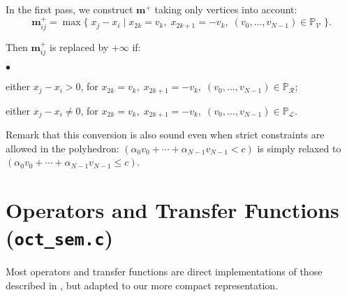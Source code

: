 \documentclass[twosides]{report}
\newenvironment{mylist}
        {\vskip-3mm\begin{list}{$\bullet$}{\setlength{\leftmargin}{.5cm}}}
        {\end{list}}
\renewcommand{\vec}[1]{{{\mathbf #1}}}
\begin{document}
In the first pass, we construct $\vec{m}^+$ taking only 
vertices into account:
$$\vec{m}^+_{ij}=\max
\{\;x_j-x_i\;|\;x_{2k}=v_k,\;x_{2k+1}=-v_k,\;
(v_0,\ldots,v_{N-1})\in\mathbb{P}_{\mathcal{V}}\;\}.$$

Then $\vec{m}^+_{ij}$ is replaced by $+\infty$ if:
\begin{mylist}
\item either $x_j-x_i>0$, for $x_{2k}=v_k,\;x_{2k+1}=-v_k,\;
(v_0,\ldots,v_{N-1})\in\mathbb{P}_{\mathcal{R}}$;
\item either $x_j-x_i\neq 0$, for $x_{2k}=v_k,\;x_{2k+1}=-v_k,\;
(v_0,\ldots,v_{N-1})\in\mathbb{P}_{\mathcal{L}}$.
\end{mylist}


Remark that this conversion is also sound even
when strict constraints are allowed
in the polyhedron: $(\alpha_0 v_0+\cdots+\alpha_{N-1} v_{N-1}<c)$ 
is simply relaxed to $(\alpha_0 v_0+\cdots+\alpha_{N-1} v_{N-1}\leq c)$.


\section{Operators and Transfer Functions ({\tt oct\_sem.c})}

Most operators and transfer functions are direct implementations of
those described in \cite{mine:ast01}, but adapted to our more compact
representation.


\cleardoublepage



\cleardoublepage
\printindex

\label{theend}~
\end{document}
